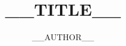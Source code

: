 \def\mytitle{__TITLE__}
\def\myauthor{__AUTHOR__}
\def\mychapter{章節名稱}
\def\myinfo{作者資訊}
\title{__TITLE__}
\author{__AUTHOR__}
